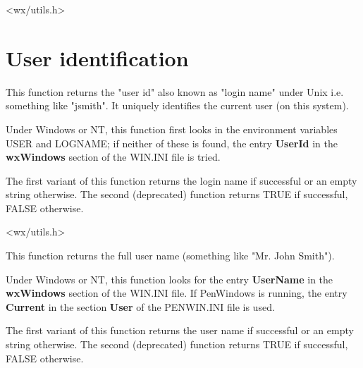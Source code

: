 


<wx/utils.h>

\section{User identification}\label{useridfunctions}

\label{wxgetuserid}



This function returns the "user id" also known as "login name" under Unix i.e.
something like "jsmith". It uniquely identifies the current user (on this system).

Under Windows or NT, this function first looks in the environment
variables USER and LOGNAME; if neither of these is found, the entry {\bf UserId}\rtfsp
in the {\bf wxWindows} section of the WIN.INI file is tried.

The first variant of this function returns the login name if successful or an
empty string otherwise. The second (deprecated) function returns TRUE
if successful, FALSE otherwise.




<wx/utils.h>

\label{wxgetusername}



This function returns the full user name (something like "Mr. John Smith").

Under Windows or NT, this function looks for the entry {\bf UserName}\rtfsp
in the {\bf wxWindows} section of the WIN.INI file. If PenWindows
is running, the entry {\bf Current} in the section {\bf User} of
the PENWIN.INI file is used.

The first variant of this function returns the user name if successful or an
empty string otherwise. The second (deprecated) function returns TRUE
if successful, FALSE otherwise.

